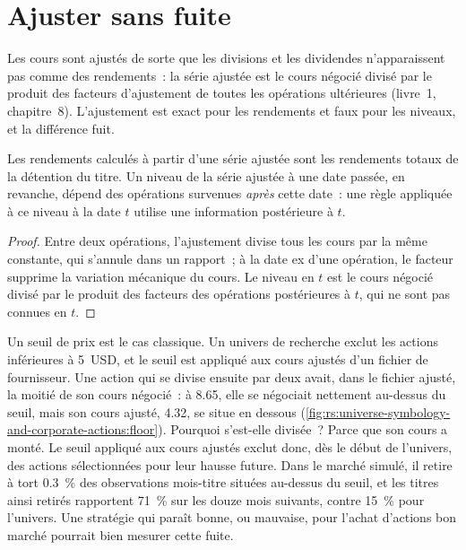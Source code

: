 \section{Ajuster sans fuite}

Les cours sont ajustés de sorte que les divisions et les dividendes n'apparaissent pas comme des rendements~: la série ajustée est le cours négocié divisé par
le produit des facteurs d'ajustement de toutes les opérations ultérieures (livre~1, chapitre~8). L'ajustement est exact pour les rendements et faux pour
les niveaux, et la différence fuit.

\begin{proposition}\label{prop:rs:universe-symbology-and-corporate-actions:adjusted}
Les rendements calculés à partir d'une série ajustée sont les rendements totaux de la détention du titre. Un niveau de la série ajustée à une
date passée, en revanche, dépend des opérations survenues \emph{après} cette date~: une règle appliquée à ce niveau à la date $t$ utilise une information
postérieure à $t$.
\end{proposition}

\begin{proof}
Entre deux opérations, l'ajustement divise tous les cours par la même constante, qui s'annule dans un rapport~; à la date ex d'une opération, le
facteur supprime la variation mécanique du cours. Le niveau en $t$ est le cours négocié divisé par le produit des facteurs des
opérations postérieures à $t$, qui ne sont pas connues en $t$.
\end{proof}

Un seuil de prix est le cas classique. Un univers de recherche exclut les actions inférieures à 5~USD, et le seuil est appliqué aux cours
ajustés d'un fichier de fournisseur. Une action qui se divise ensuite par deux avait, dans le fichier ajusté, la moitié de son cours négocié~: à 8.65, elle se négociait
nettement au-dessus du seuil, mais son cours ajusté, 4.32, se situe en dessous
(\cref{fig:rs:universe-symbology-and-corporate-actions:floor}). Pourquoi s'est-elle divisée~? Parce que son cours a monté. Le seuil appliqué aux cours
ajustés exclut donc, dès le début de l'univers, des actions sélectionnées pour leur hausse future. Dans le marché simulé, il retire à tort
0.3~\% des observations mois-titre situées au-dessus du seuil, et les titres ainsi retirés rapportent 71~\% sur les douze mois suivants, contre 15~\%
pour l'univers. Une stratégie qui paraît bonne, ou mauvaise, pour l'achat d'actions bon marché pourrait bien mesurer cette fuite.

